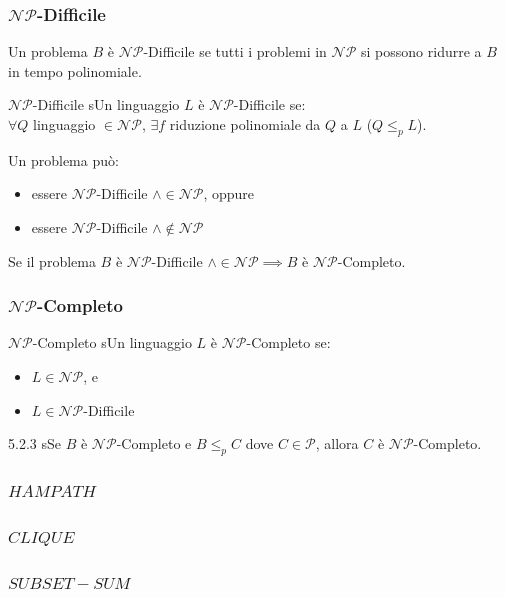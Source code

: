 \documentclass{article}  %
\theoremstyle{definition}
\begin{document}
\subsubsection{$\mathcal{NP}$-Difficile}
Un problema $B$ è $\mathcal{NP}$-Difficile se tutti i problemi in $\mathcal{NP}$ si possono ridurre a $B$ in tempo polinomiale.
\begin{theorem}{$\mathcal{NP}$-Difficile}
	sUn linguaggio $L$ è $\mathcal{NP}$-Difficile se: \\ $\forall{Q}$ linguaggio $\in \mathcal{NP}$, $\exists f$ riduzione 
	polinomiale da $Q$ a $L$ ($Q \leq_p L$).
\end{theorem}
Un problema può:
\begin{itemize}
	\item essere $\mathcal{NP}$-Difficile $\land \in \mathcal{NP}$, oppure
	\item essere $\mathcal{NP}$-Difficile $\land \notin \mathcal{NP}$
\end{itemize}
Se il problema $B$ è $\mathcal{NP}$-Difficile $\land \in \mathcal{NP} \implies B$ è $\mathcal{NP}$-Completo.
\subsubsection{$\mathcal{NP}$-Completo}
\begin{theorem}{$\mathcal{NP}$-Completo}
	sUn linguaggio $L$ è $\mathcal{NP}$-Completo se:
	\begin{itemize}
		\item $L \in \mathcal{NP}$, e
		\item $L \in \mathcal{NP}$-Difficile 
	\end{itemize}
\end{theorem}

\begin{theorem}{5.2.3}
	sSe $B$ è $\mathcal{NP}$-Completo e $B \leq_p C$ dove $C \in \mathcal{P}$, allora $C$ è $\mathcal{NP}$-Completo.
\end{theorem}
\subsubsection{$HAMPATH$}
\subsubsection{$CLIQUE$}
\subsubsection{$SUBSET-SUM$}
\end{document}
